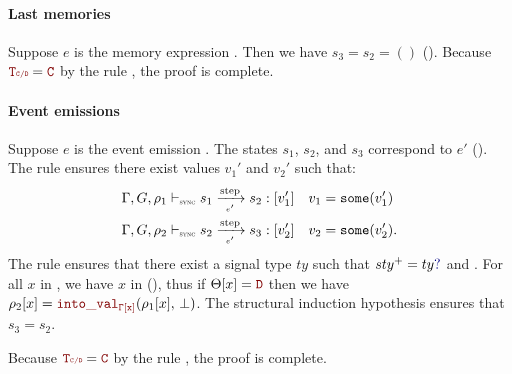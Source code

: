 \begin{skippableproof}
    \paragraph{Last memories}
    Suppose $e$ is the memory expression .
    Then we have $s_3 = s_2 = ()$ ().
    Because $\rType = \cType$ by the rule , the
    proof is complete.

    \paragraph{Event emissions}
    Suppose $e$ is the event emission .
    The states $s_1$, $s_2$, and $s_3$ correspond to $e'$ ().
    The rule  ensures there exist values
    $v_1'$ and $v_2'$ such that:
    \begin{align*}
        \exprOpsem{\rho_1}{s_1}{e'}{s_2}{v'_1} &  & v_1 & = \some{v'_1}  \\
        \exprOpsem{\rho_2}{s_2}{e'}{s_3}{v'_2} &  & v_2 & = \some{v'_2}.
    \end{align*}
    The rule  ensures that there exist a signal type
    $ty$ such that $sty^+ = \mayB{ty}$ and .
    For all $x$ in , we have $x$ in 
    (), thus if $\Theta[x] = \dType$
    then we have $\rho_2[x] = \intoVal{\tyCtx[x]}{\rho_1[x]}{\bot}$.
    The structural induction hypothesis ensures that $s_3 = s_2$.

    Because $\rType = \cType$ by the rule , the
    proof is complete.


\end{skippableproof}
